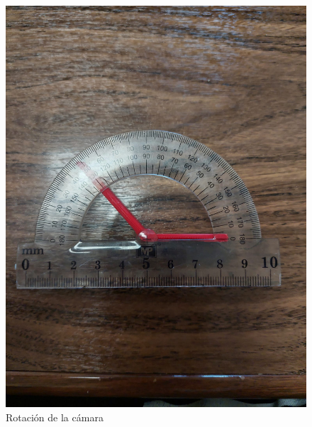 \begin{figure}[ht!]
	\centering
	\begin{minipage}{0.45\linewidth}
		\centering
		\includegraphics[width=\linewidth]{figs/cap6/rotation.jpeg}
		\caption*{\centering Rotación de la cámara} 
	\end{minipage}
	\hspace{0.25cm}
	\begin{minipage}{0.45\linewidth}
		\centering

\end{minipage}
\end{figure}
